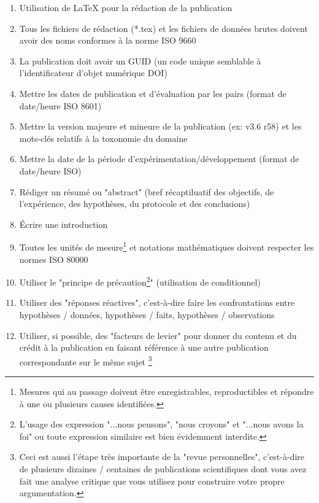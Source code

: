 	\begin{enumerate}[label=\protect\circledbullet{\arabic*},leftmargin=15mm]
		\item Utilisation de \LaTeX{} pour la r\'edaction de la publication
		
		\item Tous les fichiers de r\'edaction (*.tex) et les fichiers de donn\'ees brutes doivent avoir des noms conformes à la norme ISO 9660
		
		\item La publication doit avoir un GUID (un code unique semblable à l'identificateur d'objet num\'erique DOI)
		
		\item Mettre les dates de publication et d'\'evaluation par les pairs (format de date/heure ISO 8601)
		
		\item Mettre la version majeure et mineure de la publication (ex: v3.6 r58) et les mots-clés relatifs à la toxonomie du domaine
		
		\item Mettre la date de la p\'eriode d'exp\'erimentation/d\'eveloppement (format de date/heure ISO) 
		
		\item R\'ediger un r\'esum\'e ou "abstract" (bref r\'ecaptiluatif des objectifs, de l'exp\'erience, des hypothèses, du protocole et des conclusions)
		
		\item \'Ecrire une introduction
		
		\item Toutes les unit\'es de mesure\footnote{Mesures qui au passage doivent être enregistrables, reproductibles et r\'epondre à une ou plusieurs causes identifi\'ees.} et notations math\'ematiques doivent respecter les normes ISO 80000
		
		\item Utiliser le "principe de pr\'ecaution\footnote{L'usage des expression "...nous pensons", "nous croyons" et "...nous avons la foi" ou toute expression similaire est bien \'evidemment interdite.}" (utilisation de conditionnel)
		
		\item Utiliser des "r\'eponses r\'eactives", c'est-à-dire faire les confrontations entre hypothèses / donn\'ees, hypothèses / faits, hypothèses / observations
		
		\item Utiliser, si possible, des "facteurs de levier" pour donner du contenu et du cr\'edit à la publication en faisant r\'ef\'erence à une autre publication correspondante sur le même sujet \footnote{Ceci est aussi l'\'etape très importante de la "revue personnelles", c'est-à-dire de plusieurs dizaines / centaines de publications scientifiques dont vous avez fait une analyse critique que vous utilisez pour construire votre propre argumentation.}
		

\end{enumerate}
